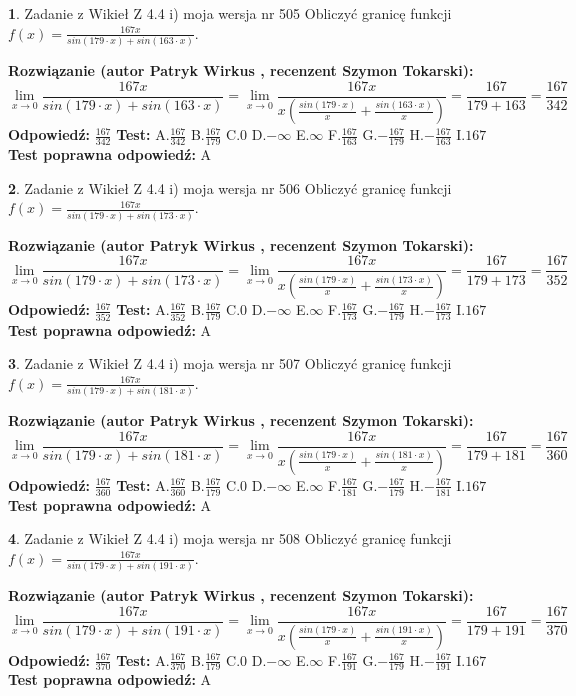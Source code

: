 \documentclass[12pt, a4paper]{article}
\theoremstyle{definition} %
\newtheorem{zad}{}
\newcommand{\zadStart}[1]{\begin{zad}#1\newline}
\newcommand{\zadStop}{\end{zad}}
\newcommand{\rozwStart}[2]{\noindent \textbf{Rozwiązanie (autor #1 , recenzent #2): }\newline}
\newcommand{\rozwStop}{\newline}
\newcommand{\odpStart}{\noindent \textbf{Odpowiedź:}\newline}
\newcommand{\odpStop}{\newline}
\newcommand{\testStart}{\noindent \textbf{Test:}\newline}
\newcommand{\testStop}{\newline}
\newcommand{\kluczStart}{\noindent \textbf{Test poprawna odpowiedź:}\newline}
\newcommand{\kluczStop}{\newline}
\begin{document}
\zadStart{Zadanie z Wikieł Z 4.4 i) moja wersja nr 505}
Obliczyć granicę funkcji $f(x)=\frac{167x}{sin(179\cdot x) +sin(163\cdot x)}$.
\zadStop
\rozwStart{Patryk Wirkus}{Szymon Tokarski}
$$\lim\limits_{x\to 0}\frac{167x}{sin(179\cdot x) +sin(163\cdot x)}=\lim\limits_{x\to 0}\frac{167x}{x(\frac{sin(179\cdot x)}{x}+\frac{sin(163\cdot x)}{x})}=\frac{167}{179+163} = \frac{167}{342}$$
\rozwStop
\odpStart
$\frac{167}{342}$
\odpStop
\testStart
A.$\frac{167}{342}$
B.$\frac{167}{179}$
C.$0$
D.$-\infty$
E.$\infty$
F.$\frac{167}{163}$
G.$-\frac{167}{179}$
H.$-\frac{167}{163}$
I.$167$
\testStop
\kluczStart
A
\kluczStop



\zadStart{Zadanie z Wikieł Z 4.4 i) moja wersja nr 506}
Obliczyć granicę funkcji $f(x)=\frac{167x}{sin(179\cdot x) +sin(173\cdot x)}$.
\zadStop
\rozwStart{Patryk Wirkus}{Szymon Tokarski}
$$\lim\limits_{x\to 0}\frac{167x}{sin(179\cdot x) +sin(173\cdot x)}=\lim\limits_{x\to 0}\frac{167x}{x(\frac{sin(179\cdot x)}{x}+\frac{sin(173\cdot x)}{x})}=\frac{167}{179+173} = \frac{167}{352}$$
\rozwStop
\odpStart
$\frac{167}{352}$
\odpStop
\testStart
A.$\frac{167}{352}$
B.$\frac{167}{179}$
C.$0$
D.$-\infty$
E.$\infty$
F.$\frac{167}{173}$
G.$-\frac{167}{179}$
H.$-\frac{167}{173}$
I.$167$
\testStop
\kluczStart
A
\kluczStop



\zadStart{Zadanie z Wikieł Z 4.4 i) moja wersja nr 507}
Obliczyć granicę funkcji $f(x)=\frac{167x}{sin(179\cdot x) +sin(181\cdot x)}$.
\zadStop
\rozwStart{Patryk Wirkus}{Szymon Tokarski}
$$\lim\limits_{x\to 0}\frac{167x}{sin(179\cdot x) +sin(181\cdot x)}=\lim\limits_{x\to 0}\frac{167x}{x(\frac{sin(179\cdot x)}{x}+\frac{sin(181\cdot x)}{x})}=\frac{167}{179+181} = \frac{167}{360}$$
\rozwStop
\odpStart
$\frac{167}{360}$
\odpStop
\testStart
A.$\frac{167}{360}$
B.$\frac{167}{179}$
C.$0$
D.$-\infty$
E.$\infty$
F.$\frac{167}{181}$
G.$-\frac{167}{179}$
H.$-\frac{167}{181}$
I.$167$
\testStop
\kluczStart
A
\kluczStop



\zadStart{Zadanie z Wikieł Z 4.4 i) moja wersja nr 508}
Obliczyć granicę funkcji $f(x)=\frac{167x}{sin(179\cdot x) +sin(191\cdot x)}$.
\zadStop
\rozwStart{Patryk Wirkus}{Szymon Tokarski}
$$\lim\limits_{x\to 0}\frac{167x}{sin(179\cdot x) +sin(191\cdot x)}=\lim\limits_{x\to 0}\frac{167x}{x(\frac{sin(179\cdot x)}{x}+\frac{sin(191\cdot x)}{x})}=\frac{167}{179+191} = \frac{167}{370}$$
\rozwStop
\odpStart
$\frac{167}{370}$
\odpStop
\testStart
A.$\frac{167}{370}$
B.$\frac{167}{179}$
C.$0$
D.$-\infty$
E.$\infty$
F.$\frac{167}{191}$
G.$-\frac{167}{179}$
H.$-\frac{167}{191}$
I.$167$
\testStop
\kluczStart
A
\kluczStop
\end{document}
